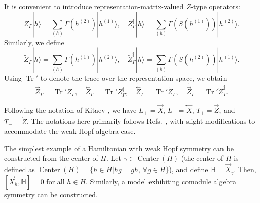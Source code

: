 \documentclass[a4paper,11pt]{article}
\theoremstyle{theorem}
\theoremstyle{remark}
\newcommand{\XR}{\overset{\rightarrow}{X}}
\newcommand{\XL}{\overset{\leftarrow}{X}}
\newcommand{\ZR}{\overset{\rightarrow}{Z}}
\newcommand{\ZL}{\overset{\leftarrow}{Z}}
\newcommand{\cone}{(1)}
\newcommand{\ctwo}{(2)}
\newcommand\Tr{\operatorname{Tr}}
\begin{document}
It is convenient to introduce representation-matrix-valued $Z$-type operators:
\begin{equation}
    Z_{\Gamma}|h\rangle = \sum_{(h)} \Gamma(h^{\ctwo}) |h^{\cone}\rangle, \quad Z_{\Gamma}^{\ddagger} |h\rangle = \sum_{(h)} \Gamma(S(h^{\cone})) |h^{\ctwo}\rangle.
\end{equation}
Similarly, we define
\begin{equation}
    \tilde{Z}_{\Gamma} |h\rangle= \sum_{(h)} \Gamma(h^{\cone}) |h^{\ctwo}\rangle, \quad \tilde{Z}_{\Gamma}^{\ddagger} |h\rangle= \sum_{(h)} \Gamma(S(h^{\ctwo})) |h^{\cone}\rangle.
\end{equation}
Using $\operatorname{Tr}'$ to denote the trace over the representation space, we obtain
\begin{equation}
    \ZR_{\Gamma} = \Tr' Z_{\Gamma}, \quad \ZL_{\Gamma} = \Tr' Z^{\ddagger}_{\Gamma}, \quad \tilde{\ZL}_{\Gamma} = \Tr' \tilde{Z}_{\Gamma}, \quad \tilde{\ZR}_{\Gamma} = \Tr' \tilde{Z}^{\ddagger}_{\Gamma}.
\end{equation}






Following the notation of Kitaev \cite{Kitaev2003, Buerschaper2013a,jia2023boundary,Jia2023weak}, we have $L_+ = \XR$, $L_- = \XL$, $T_+ = \ZR$, and $T_- = \ZL$. The notations here primarily follows Refs.~\cite{albert2021spin, fechisin2023noninvertible, jia2024generalized}, with slight modifications to accommodate the weak Hopf algebra case.



The simplest example of a Hamiltonian with weak Hopf symmetry can be constructed from the center of $H$. Let $\gamma \in \operatorname{Center}(H)$ (the center of $H$ is defined as $\operatorname{Center}(H)=\{h\in H| hg=gh,\, \forall g\in H\}$), and define $\mathbb{H} = \XR_\gamma$. Then, $[\XR_h, \mathbb{H}] = 0$ for all $h\in H$. Similarly, a model exhibiting comodule algebra symmetry can be constructed.
\end{document}
